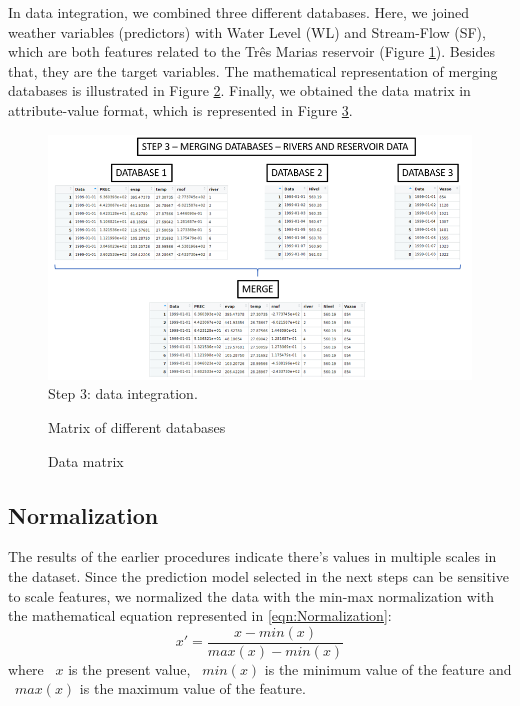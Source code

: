\documentclass[12pt]{article}
\begin{document}
In data integration, we combined three different databases. Here, we joined weather variables (predictors) with Water Level (WL) and Stream-Flow (SF), which are both features related to the Três Marias reservoir (Figure \ref{fig:step3}). Besides that, they are the target variables. The mathematical representation of merging databases is illustrated in Figure \ref{fig:matriz1}. Finally, we obtained the data matrix in attribute-value format, which is represented in Figure \ref{fig:matriz2}.

\begin{figure}[htbp]
  \centering
  \includegraphics[width=1\linewidth, trim=0cm 0 0 1.2cm,clip=true]{Figures/STEP3.png}
  \caption{Step 3: data integration.}
  \label{fig:step3}
\end{figure}

\begin{figure}[htbp]
  \centering
  
  \caption{Matrix of different databases}
  \label{fig:matriz1}
\end{figure}



\begin{figure}[htbp]
  \centering
  
  \caption{Data matrix}
  \label{fig:matriz2}
\end{figure}

\subsection{Normalization}
The results of the earlier procedures indicate there's values in multiple scales in the dataset. Since the prediction model selected in the next steps can be sensitive to scale features, we normalized the data with the min-max normalization with the mathematical equation represented in \ref{eqn:Normalization}:
\begin{equation}
\label{eqn:Normalization}
x' = \frac{x-min(x)}{max(x)-min(x)}
\end{equation}
where ~$x$ is the present value, ~$min(x)$ is the minimum value of the feature and ~$max(x)$ is the maximum value of the feature.
\end{document}
